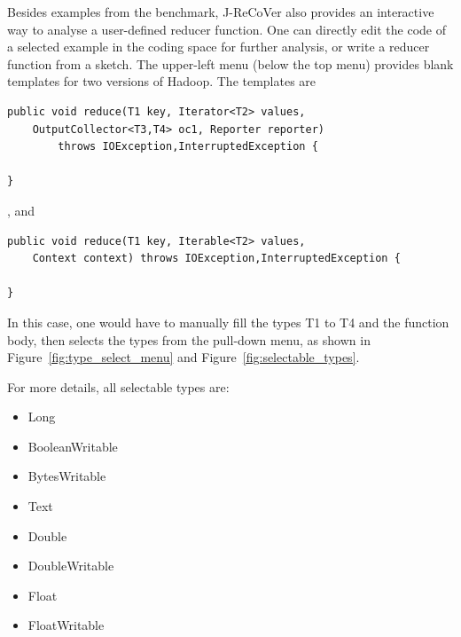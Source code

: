 Besides examples from the benchmark, J-ReCoVer also provides an interactive way to analyse a user-defined reducer function. 
One can directly edit the code of a selected example in the coding space for further analysis, or write a reducer function from a sketch. 
The upper-left menu (below the top menu) provides blank templates for two versions of Hadoop. The templates are

\begin{mdframed}[roundcorner=5pt]
\begin{verbatim}
public void reduce(T1 key, Iterator<T2> values,
	OutputCollector<T3,T4> oc1, Reporter reporter)
		throws IOException,InterruptedException {

}
\end{verbatim}
\end{mdframed}

, and

\begin{mdframed}[roundcorner=5pt]
\begin{verbatim}
public void reduce(T1 key, Iterable<T2> values,
	Context context) throws IOException,InterruptedException {

}
\end{verbatim}
\end{mdframed}

In this case, one would have to manually fill the types T1 to T4 and the function body, then selects the types from the pull-down menu, as shown in Figure~\ref{fig:type_select_menu} and Figure~\ref{fig:selectable_types}.

For more details, all selectable types are:

\begin{itemize}
\item Long
\item BooleanWritable
\item BytesWritable
\item Text
\item Double
\item DoubleWritable
\item Float
\item FloatWritable
\end{itemize}
